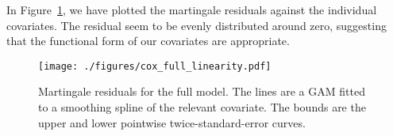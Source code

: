 \documentclass[11pt,a4paper]{article}
\begin{document}


In Figure~\ref{fig:cox_full_linearity}, we have plotted the martingale residuals against the individual covariates. The residual seem to be evenly distributed around zero, suggesting that the functional form of our covariates are appropriate.

\begin{figure}[h!tb]
    \begin{center}
        \texttt{[image: ./figures/cox\_full\_linearity.pdf]}
    \end{center}
    \vspace{-0.8cm}
    \caption{Martingale residuals for the full model. The lines are a GAM fitted to a smoothing spline of the relevant covariate. The bounds are the upper and lower pointwise twice-standard-error curves.}
    \label{fig:cox_full_linearity}
\end{figure}











\cleardoublepage{}
{}
%
%
%
%



%
%
\end{document}
